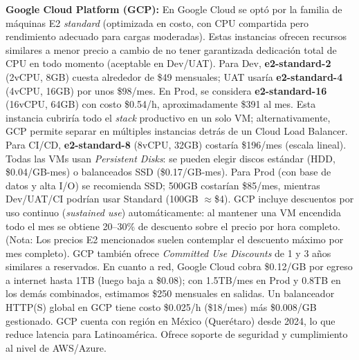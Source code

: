 \documentclass[12pt]{article}
\begin{document}
\textbf{Google Cloud Platform (GCP):} En Google Cloud se optó por la familia de máquinas E2 \emph{standard} (optimizada en costo, con CPU compartida pero rendimiento adecuado para cargas moderadas). Estas instancias ofrecen recursos similares a menor precio a cambio de no tener garantizada dedicación total de CPU en todo momento (aceptable en Dev/UAT). Para Dev, \textbf{e2-standard-2} (2vCPU, 8GB) cuesta alrededor de \$49 mensuales; UAT usaría \textbf{e2-standard-4} (4vCPU, 16GB) por unos \$98/mes. En Prod, se considera \textbf{e2-standard-16} (16vCPU, 64GB) con costo \$0.54/h, aproximadamente \$391 al mes. Esta instancia cubriría todo el \emph{stack} productivo en un solo VM; alternativamente, GCP permite separar en múltiples instancias detrás de un Cloud Load Balancer. Para CI/CD, \textbf{e2-standard-8} (8vCPU, 32GB) costaría \$196/mes (escala lineal). Todas las VMs usan \emph{Persistent Disks}: se pueden elegir discos estándar (HDD, \$0.04/GB-mes) o balanceados SSD (\$0.17/GB-mes). Para Prod (con base de datos y alta I/O) se recomienda SSD; 500GB costarían \$85/mes, mientras Dev/UAT/CI podrían usar Standard (100GB \(\approx\)\$4). GCP incluye descuentos por uso continuo (\emph{sustained use}) automáticamente: al mantener una VM encendida todo el mes se obtiene 20--30\% de descuento sobre el precio por hora completo. (Nota: Los precios E2 mencionados suelen contemplar el descuento máximo por mes completo). GCP también ofrece \emph{Committed Use Discounts} de 1 y 3 años similares a reservados. En cuanto a red, Google Cloud cobra \$0.12/GB por egreso a internet hasta 1TB (luego baja a \$0.08); con 1.5TB/mes en Prod y 0.8TB en los demás combinados, estimamos \$250 mensuales en salidas. Un balanceador HTTP(S) global en GCP tiene costo \$0.025/h (\$18/mes) más \$0.008/GB gestionado. GCP cuenta con región en México (Querétaro) desde 2024, lo que reduce latencia para Latinoamérica. Ofrece soporte de seguridad y cumplimiento al nivel de AWS/Azure.
\end{document}
